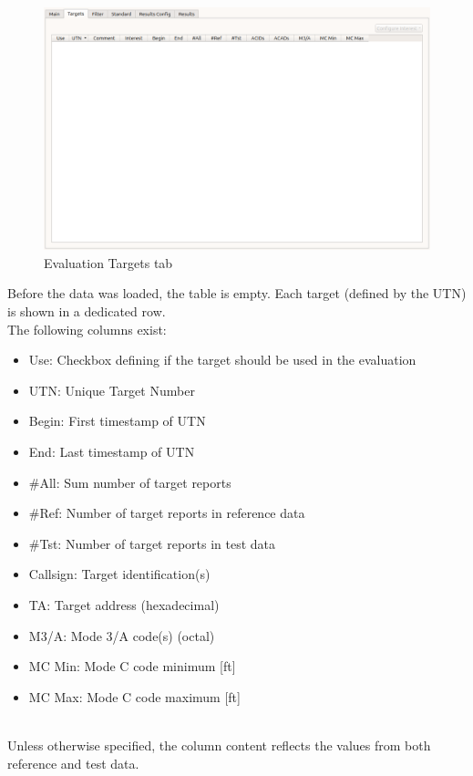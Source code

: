 \begin{figure}[H]
  \hspace*{-2cm}
    \includegraphics[width=18cm,frame]{figures/eval_targets_empty.png}
  \caption{Evaluation Targets tab}
\end{figure}

Before the data was loaded, the table is empty. Each target (defined by the UTN) is shown in a dedicated row. \\

The following columns exist:

\begin{itemize}  
\item Use: Checkbox defining if the target should be used in the evaluation
\item UTN: Unique Target Number
\item Begin: First timestamp of UTN
\item End: Last timestamp of UTN
\item \#All: Sum number of target reports
\item \#Ref: Number of target reports in reference data
\item \#Tst: Number of target reports in test data
\item Callsign: Target identification(s)
\item TA: Target address (hexadecimal)
\item M3/A: Mode 3/A code(s) (octal)
\item MC Min: Mode C code minimum [ft]
\item MC Max: Mode C code maximum [ft]
\end{itemize}
\ \\

Unless otherwise specified, the column content reflects the values from both reference and test data. \\

